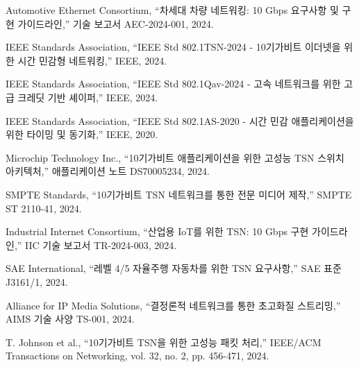 \documentclass[12pt, a4paper]{article}
\begin{document}
\begin{thebibliography}{20}

Automotive Ethernet Consortium, ``차세대 차량 네트워킹: 10 Gbps 요구사항 및 구현 가이드라인,'' 기술 보고서 AEC-2024-001, 2024.

IEEE Standards Association, ``IEEE Std 802.1TSN-2024 - 10기가비트 이더넷을 위한 시간 민감형 네트워킹,'' IEEE, 2024.

IEEE Standards Association, ``IEEE Std 802.1Qav-2024 - 고속 네트워크를 위한 고급 크레딧 기반 셰이퍼,'' IEEE, 2024.

IEEE Standards Association, ``IEEE Std 802.1AS-2020 - 시간 민감 애플리케이션을 위한 타이밍 및 동기화,'' IEEE, 2020.

Microchip Technology Inc., ``10기가비트 애플리케이션을 위한 고성능 TSN 스위치 아키텍처,'' 애플리케이션 노트 DS70005234, 2024.

SMPTE Standards, ``10기가비트 TSN 네트워크를 통한 전문 미디어 제작,'' SMPTE ST 2110-41, 2024.

Industrial Internet Consortium, ``산업용 IoT를 위한 TSN: 10 Gbps 구현 가이드라인,'' IIC 기술 보고서 TR-2024-003, 2024.

SAE International, ``레벨 4/5 자율주행 자동차를 위한 TSN 요구사항,'' SAE 표준 J3161/1, 2024.

Alliance for IP Media Solutions, ``결정론적 네트워크를 통한 초고화질 스트리밍,'' AIMS 기술 사양 TS-001, 2024.

T. Johnson et al., ``10기가비트 TSN을 위한 고성능 패킷 처리,'' IEEE/ACM Transactions on Networking, vol. 32, no. 2, pp. 456-471, 2024.

\end{thebibliography}
\end{document}
